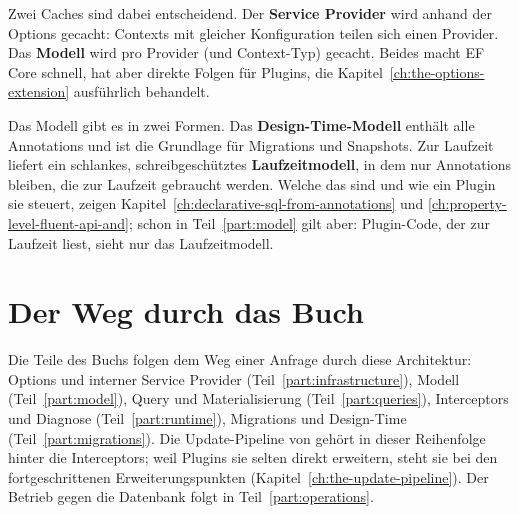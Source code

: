 \begin{flowdiagram}
\end{flowdiagram}

Zwei Caches sind dabei entscheidend. Der \textbf{Service Provider} wird anhand der Options
gecacht: Contexts mit gleicher Konfiguration teilen sich einen Provider. Das \textbf{Modell}
wird pro Provider (und Context-Typ) gecacht. Beides macht EF Core schnell, hat aber direkte
Folgen für Plugins, die Kapitel~\ref{ch:the-options-extension} ausführlich behandelt.

Das Modell gibt es in zwei Formen. Das \textbf{Design-Time-Modell} enthält alle
Annotations und ist die Grundlage für Migrations und Snapshots. Zur Laufzeit liefert
 ein schlankes, schreibgeschütztes \textbf{Laufzeitmodell},
in dem nur Annotations bleiben, die zur Laufzeit gebraucht werden. Welche das sind und wie
ein Plugin sie steuert, zeigen Kapitel~\ref{ch:declarative-sql-from-annotations} und
\ref{ch:property-level-fluent-api-and}; schon in Teil~\ref{part:model} gilt aber: Plugin-Code,
der zur Laufzeit liest, sieht nur das Laufzeitmodell.

\section{Der Weg durch das Buch}

Die Teile des Buchs folgen dem Weg einer Anfrage durch diese Architektur: Options und
interner Service Provider (Teil~\ref{part:infrastructure}), Modell (Teil~\ref{part:model}),
Query und Materialisierung (Teil~\ref{part:queries}), Interceptors und Diagnose
(Teil~\ref{part:runtime}), Migrations und Design-Time (Teil~\ref{part:migrations}). Die
Update-Pipeline von  gehört in dieser Reihenfolge hinter die
Interceptors; weil Plugins sie selten direkt erweitern, steht sie bei den fortgeschrittenen
Erweiterungspunkten (Kapitel~\ref{ch:the-update-pipeline}). Der Betrieb gegen die Datenbank
folgt in Teil~\ref{part:operations}.

